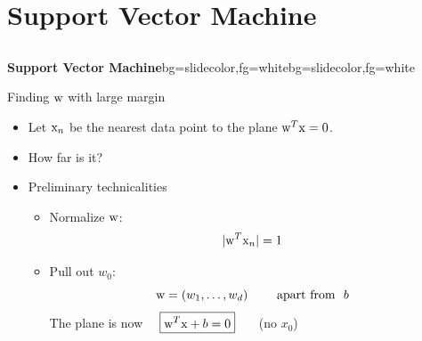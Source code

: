 %
%
%

\section{Support Vector Machine}
\subsection{}
\begin{frame}{}
\begin{variableblock}{\centering \Large \textbf{\vspace{4pt}\newline Support Vector Machine\vspace{4pt}}}{bg=slidecolor,fg=white}{bg=slidecolor,fg=white}
\end{variableblock}
\end{frame}

\begin{frame}{Finding ${\rm w}$ with large margin}
\begin{itemize}
\item Let ${\rm x}_n$ be the nearest data point to the plane ${\rm w}^T{\rm x}=0$. \item How far is it?
\item Preliminary technicalities
\begin{itemize}
\item Normalize ${\rm w}$:
\[|{\rm w}^T{\rm x}_n|=1\]
\item Pull out $w_0$:
\[{\rm w}=(w_1,\ldots,w_d) ~~~~~~~ \text{apart from}~~ b\]
The plane is now~~ $\boxed{{\rm w}^T{\rm x}+b=0}$ ~~~(no $x_0$)
\end{itemize}
\end{itemize}
\end{frame}

